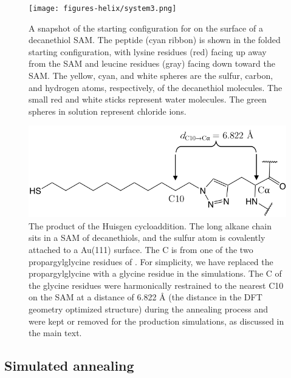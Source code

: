 \begin{figure}
    \center
    \texttt{[image: figures-helix/system3.png]}
    \caption[Starting configuration of \pep{} on the surface of a SAM]{
        A snapshot of the starting configuration for \pep{} on the surface of a decanethiol SAM. 
        The peptide (cyan ribbon) is shown in the folded starting configuration, with lysine residues (red) facing up away from the SAM and leucine residues (gray) facing down toward the SAM. 
        The yellow, cyan, and white spheres are the sulfur, carbon, and hydrogen atoms, respectively, of the decanethiol molecules. 
        The small red and white sticks represent water molecules. 
        The green spheres in solution represent chloride ions. 
    }
    \label{fig:helix-system}
\end{figure}

\begin{figure}
    \center
    \includegraphics[width=4.5in]{figures-helix/Linker_figure.png}
    \caption[The product of the Huisgen cycloaddition]{
        The product of the Huisgen cycloaddition. 
        The long alkane chain sits in a SAM of decanethiols, and the sulfur atom is covalently attached to a Au(111) surface. 
        The C\textalpha{} is from one of the two propargylglycine residues of \pep{}. 
        For simplicity, we have replaced the propargylglycine with a glycine residue in the simulations. 
        The C\textalpha{} of the glycine residues were harmonically restrained to the nearest C10 on the SAM at a distance of 6.822 \si{\angstrom} (the distance in the DFT geometry optimized structure) during the annealing process and were kept or removed for the production simulations, as discussed in the main text.
    }
    \label{fig:helix-linker}
\end{figure}

\subsection{Simulated annealing}\label{helix-anneal}

